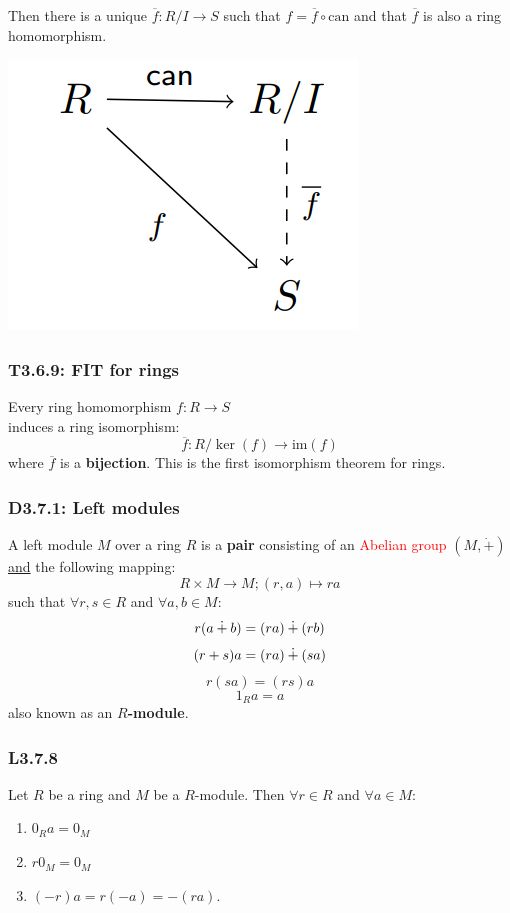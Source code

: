 \documentclass{article}
\begin{document}
\begin{multicols*}{3}
\begin{enumerate}
    Then there is
    a unique $\overline{f}:R/I\rightarrow S$
    such that $f=\overline{f}\circ\text{can}$ and that
    $\overline{f}$ is also a ring homomorphism.
\end{enumerate}
\begin{center}
    \includegraphics[scale=0.5]{f01.png}
\end{center}

\subsubsection*{T3.6.9: FIT for rings}
Every ring homomorphism $f:R\rightarrow S$ \\
induces a ring isomorphism:
$$\overline{f}:R/\ker(f)\rightarrow\text{im}(f)$$
where $\overline{f}$ is a \textbf{bijection}. This is
the first isomorphism theorem for rings.

\subsubsection*{D3.7.1: Left modules}
A left module $M$ over a ring $R$ is a \textbf{pair} consisting
of an \textcolor{red}{Abelian group} $(M,\dot{+})$
\underline{and} the following mapping:
$$R\times M\rightarrow M;(r,a)\mapsto ra$$
such that $\forall r,s\in R$ and $\forall a,b\in M$:
$$r(a\hspace{0.03in}\dot{+}\hspace{0.03in}b)
=(ra)\hspace{0.03in}\dot{+}\hspace{0.03in}(rb)$$
$$(r+s)a=(ra)\hspace{0.03in}\dot{+}\hspace{0.03in}(sa)$$
$$r(sa)=(rs)a$$
$$1_R a=a$$
also known as an \textbf{$R$-module}.

\subsubsection*{L3.7.8}
Let $R$ be a ring and $M$ be a $R$-module.
Then $\forall r\in R$ and $\forall a\in M$:
\begin{enumerate}
    \item $0_R a=0_M$
    \item $r0_M=0_M$
    \item $(-r)a=r(-a)=-(ra)$.
\end{enumerate}


\end{multicols*}
\end{document}

